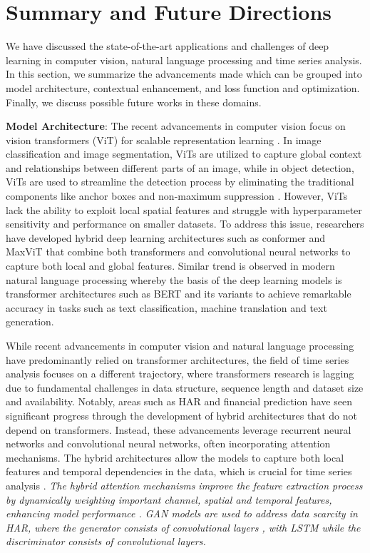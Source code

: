 \documentclass[preprint,12pt]{elsarticle}
\begin{document}
\section{Summary and Future Directions}\label{sec6}
We have discussed the state-of-the-art applications and challenges of deep learning in computer vision, natural language processing and time series analysis. In this section, we summarize the advancements made which can be grouped into model architecture, contextual enhancement, and loss function and optimization. Finally, we discuss possible future works in these domains.

\textbf{Model Architecture}: The recent advancements in computer vision focus on vision transformers (ViT) for scalable representation learning \citep{dosovitskiy_image_2021}. In image classification and image segmentation, ViTs are utilized to capture global context and relationships between different parts of an image, while in object detection, ViTs are used to streamline the detection process by eliminating the traditional components like anchor boxes and non-maximum suppression \citep{carion_end_end_2020}. However, ViTs lack the ability to exploit local spatial features and struggle with hyperparameter sensitivity and performance on smaller datasets. To address this issue, researchers have developed hybrid deep learning architectures such as conformer \citep{peng_conformer_2023} and MaxViT \citep{tu_maxvit_2022} that combine both transformers and convolutional neural networks to capture both local and global features. Similar trend is observed in modern natural language processing whereby the basis of the deep learning models is transformer architectures such as BERT \citep{devlin_bert_2018} and its variants to achieve remarkable accuracy in tasks such as text classification, machine translation and text generation.

While recent advancements in computer vision and natural language processing have predominantly relied on transformer architectures, the field of time series analysis focuses on a different trajectory, where transformers research is lagging due to fundamental challenges in data structure, sequence length and dataset size and availability. Notably, areas such as HAR and financial prediction have seen significant progress through the development of hybrid architectures that do not depend on transformers. Instead, these advancements leverage recurrent neural networks and convolutional neural networks, often incorporating attention mechanisms. The hybrid architectures allow the models to capture both local features and temporal dependencies in the data, which is crucial for time series analysis \citep{khan_attention_2021, ige_deep_2023}. \emph{The hybrid attention mechanisms improve the feature extraction process by dynamically weighting important channel, spatial and temporal features, enhancing model performance \citep{gao_danhar_2021, agac_resource-efficient_2024, tang_triple_2022}. GAN models are used to address data scarcity in HAR, where the generator consists of convolutional layers \citep{lupion_data_2024, kia_human_2024}, with LSTM \citep{chan_unified_2021} while the discriminator consists of convolutional layers.}
\end{document}
